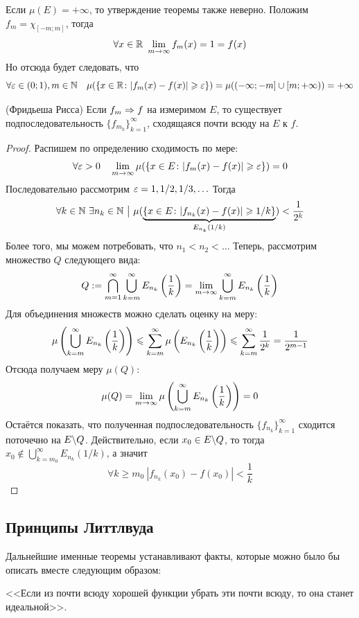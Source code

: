 \begin{note}
	Если $\mu(E) = +\infty$, то утверждение теоремы также неверно. Положим $f_m = \chi_{[-m; m]}$, тогда
	\[
		\forall x \in \mathbb{R}\ \lim_{m \to \infty} f_m(x) = 1 = f(x)
	\]
	Но отсюда будет следовать, что
	\[
		\forall \varepsilon \in (0; 1), m \in \mathbb{N} \quad \mu(\{x \in \mathbb{R} \colon |f_m(x) - f(x)| \geqslant \varepsilon\}) = \mu((-\infty; -m] \cup [m; +\infty)) = +\infty
	\]
\end{note}

\begin{theorem} (Фридьеша Рисса)
	Если $f_m \Rightarrow f$ на измеримом $E$, то существует подпоследовательность $\{f_{m_k}\}_{k = 1}^\infty$, сходящаяся почти всюду на $E$ к $f$.
\end{theorem}

\begin{proof}
	Распишем по определению сходимость по мере:
	\[
		\forall \varepsilon > 0 \quad \lim_{m \to \infty} \mu(\{x \in E \colon |f_m(x) - f(x)| \geqslant \varepsilon\}) = 0
	\]
	Последовательно рассмотрим $\varepsilon = 1, 1/2, 1/3, \ldots$ Тогда
	\[
		\forall k \in \N\ \exists n_k \in \N \such \mu(\underbrace{\{x \in E \colon |f_{n_k}(x) - f(x)| \ge 1/k\}}_{E_{n_k}(1/k)}) < \frac{1}{2^k}
	\]
	Более того, мы можем потребовать, что $n_1 < n_2 < \ldots$ Теперь, рассмотрим множество $Q$ следующего вида:
	\[
		Q := \bigcap_{m = 1}^\infty \bigcup_{k = m}^\infty E_{n_k}\left(\frac{1}{k}\right) = \lim_{m \to \infty} \bigcup_{k = m}^\infty E_{n_k}\left(\frac{1}{k}\right)
	\]
	Для объединения множеств можно сделать оценку на меру:
	\[
		\mu\left(\bigcup_{k = m}^\infty E_{n_k}\left(\frac{1}{k}\right)\right) \leqslant \sum_{k = m}^\infty \mu\left(E_{n_k}\left(\frac{1}{k}\right)\right) \leqslant \sum_{k = m}^\infty \frac{1}{2^k} = \frac{1}{2^{m - 1}}
	\]
	Отсюда получаем меру $\mu(Q)$:
	\[
		\mu(Q) = \lim_{m \to \infty} \mu\left(\bigcup_{k = m}^\infty E_{n_k}\left(\frac{1}{k}\right)\right) = 0
	\]
	Остаётся показать, что полученная подпоследовательность $\{f_{n_k}\}_{k = 1}^\infty$ сходится поточечно на $E \backslash Q$. Действительно, если $x_0 \in E \backslash Q$, то тогда $x_0 \notin \bigcup_{k = m_0}^\infty E_{n_k}(1/k)$, а значит
	\[
		\forall k \ge m_0\ |f_{n_k}(x_0) - f(x_0)| < \frac{1}{k}
	\]
\end{proof}



\subsection{Принципы Литтлвуда}

\begin{note}
	Дальнейшие именные теоремы устанавливают факты, которые можно было бы описать вместе следующим образом:
	
	<<Если из почти всюду хорошей функции убрать эти почти всюду, то она станет идеальной>>.
\end{note}

